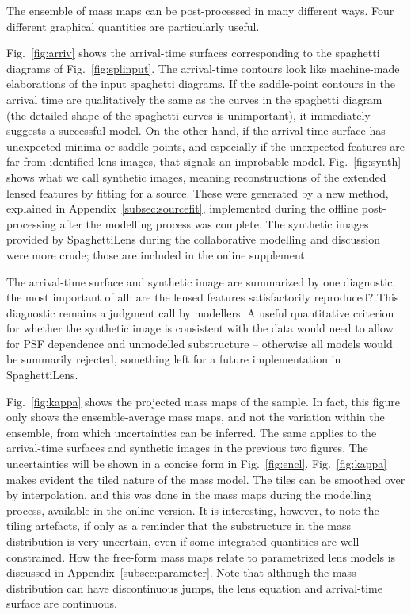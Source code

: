 The ensemble of mass maps can be post-processed in many different
ways.  Four different graphical quantities are particularly useful.

Fig.~\ref{fig:arriv} shows the arrival-time surfaces corresponding to
the spaghetti diagrams of Fig.~\ref{fig:splinput}.  The arrival-time
contours look like machine-made elaborations of the input spaghetti
diagrams.  If the saddle-point contours in the arrival time are
qualitatively the same as the curves in the spaghetti diagram (the
detailed shape of the spaghetti curves is unimportant), it immediately
suggests a successful model.  On the other hand, if the arrival-time
surface has unexpected minima or saddle points, and especially if the
unexpected features are far from identified lens images, that signals
an improbable model.  Fig.~\ref{fig:synth} shows what we call synthetic
images, meaning reconstructions of the extended lensed features by
fitting for a source.  These were generated by a new method, explained
in Appendix~\ref{subsec:sourcefit}, implemented during the offline
post-processing after the modelling process was complete.  The
synthetic images provided by SpaghettiLens during the collaborative
modelling and discussion were more crude; those are included in the
online supplement.

The arrival-time surface and synthetic image are summarized by one
diagnostic, the most important of all: are the lensed features
satisfactorily reproduced?  This diagnostic remains a judgment call by
modellers.  A useful quantitative criterion for whether the synthetic
image is consistent with the data would need to allow for PSF
dependence and unmodelled substructure -- otherwise all models would
be summarily rejected, something left for a future implementation
in SpaghettiLens.


Fig.~\ref{fig:kappa} shows the projected mass maps of the sample.  In
fact, this figure only shows the ensemble-average mass maps, and not
the variation within the ensemble, from which uncertainties can be
inferred. The same applies to the arrival-time surfaces and synthetic
images in the previous two figures. The uncertainties will be shown in
a concise form in Fig.~\ref{fig:encl}.  Fig.~\ref{fig:kappa} makes
evident the tiled nature of the mass model.  The tiles can be smoothed
over by interpolation, and this was done in the mass maps during the
modelling process, available in the online version.  It is
interesting, however, to note the tiling artefacts, if only as a
reminder that the substructure in the mass distribution is very
uncertain, even if some integrated quantities are  well
constrained.  How the free-form mass maps relate to parametrized lens
models is discussed in Appendix~\ref{subsec:parameter}.
Note that although the mass distribution can have discontinuous jumps,
the lens equation and arrival-time surface are continuous.

